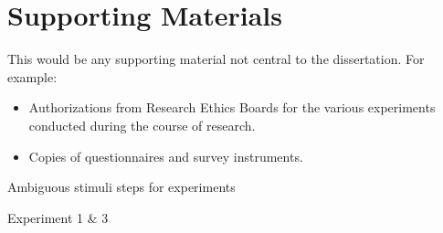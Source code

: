 \chapter{Supporting Materials}

This would be any supporting material not central to the dissertation.
For example:
\begin{itemize}
\item Authorizations from Research Ethics Boards for the various
    experiments conducted during the course of research.
\item Copies of questionnaires and survey instruments.
\end{itemize}


Ambiguous stimuli steps for experiments

Experiment 1 \& 3

\begin{tabular}


\end{tabular}
